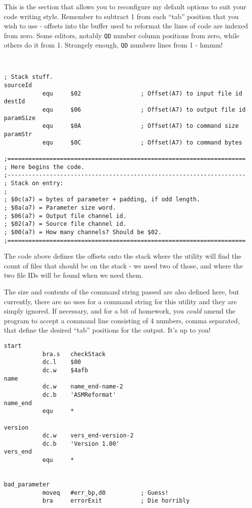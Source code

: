 This is the section that allows you to reconfigure my default options to suit your code writing style. Remember to subtract 1 from each ``tab'' position that you wish to use - offsets into the buffer used to reformat the lines of code are indexed from zero. Some editors, notably \texttt{QD} number column positions from zero, while others do it from 1. Strangely enough, \texttt{QD} numbers lines from 1 - hmmm! 
           
\begin{lstlisting}[firstnumber=last,caption={ASMReformat Source - Stack Offsets}]


; Stack stuff.
sourceId
           equ     $02                 ; Offset(A7) to input file id
destId
           equ     $06                 ; Offset(A7) to output file id
paramSize
           equ     $0A                 ; Offset(A7) to command size
paramStr
           equ     $0C                 ; Offset(A7) to command bytes

;====================================================================
; Here begins the code.
;--------------------------------------------------------------------
; Stack on entry:
;
; $0c(a7) = bytes of parameter + padding, if odd length.
; $0a(a7) = Parameter size word.
; $06(a7) = Output file channel id.
; $02(a7) = Source file channel id.
; $00(a7) = How many channels? Should be $02.
;====================================================================
\end{lstlisting}

The code above defines the offsets onto the stack where the utility will find the count of files that should be on the stack - we need two of those, and where the two file IDs will be found when we need them.

The size and contents of the command string passed are also defined here, but currently, there are no uses for a command string for this utility and they are simply ignored. If necessary, and for a bit of homework, you \emph{could} amend the program to accept a command line consisting of 4 numbers, comma separated, that define the desired ``tab'' positions for the output. It's up to you!

\begin{lstlisting}[firstnumber=last,caption={ASMReformat Source - Start Here!}]
start
           bra.s   checkStack
           dc.l    $00
           dc.w    $4afb
name
           dc.w    name_end-name-2
           dc.b    'ASMReformat'
name_end
           equ     *

version
           dc.w    vers_end-version-2
           dc.b    'Version 1.00'
vers_end
           equ     *


bad_parameter
           moveq   #err_bp,d0          ; Guess!
           bra     errorExit           ; Die horribly
\end{lstlisting}

